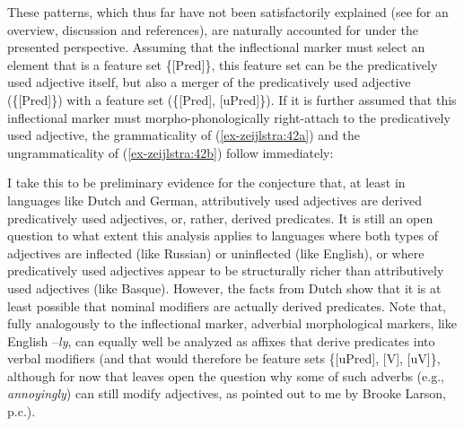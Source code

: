 \documentclass[output=paper
,modfonts
,nonflat]{langsci/langscibook}
\begin{document}
These patterns, which thus far have not been satisfactorily explained (see \citealt{SheehanTA} for an overview, discussion and references), are naturally accounted for under the presented perspective. Assuming that the inflectional marker must select an element that is a feature set \{[Pred]\}, this feature set can be the predicatively used adjective itself, but also a merger of the predicatively used adjective (\{[Pred]\}) with a feature set (\{[Pred], [uPred]\}). If it is further assumed that this inflectional marker must morpho-phonologically right-attach to the predicatively used adjective, the grammaticality of (\ref{ex-zeijlstra:42a}) and the ungrammaticality of (\ref{ex-zeijlstra:42b}) follow immediately:

\begin{exe}
\ex
	\xlist
	
	\endxlist
\end{exe}
I take this to be preliminary evidence for the conjecture that, at least in languages like Dutch and German, attributively used adjectives are derived predicatively used adjectives, or, rather, derived predicates. It is still an open question to what extent this analysis applies to languages where both types of adjectives are inflected (like Russian) or uninflected (like English), or where predicatively used adjectives appear to be structurally richer than attributively used adjectives (like Basque). However, the facts from Dutch show that it is at least possible that nominal modifiers are actually derived predicates. Note that, fully analogously to the inflectional marker, adverbial morphological markers, like English –\textit{ly}, can equally well be analyzed as affixes that derive predicates into verbal modifiers (and that would therefore be feature sets \{[uPred], [V], [uV]\}, although for now that leaves open the question why some of such adverbs (e.g., \textit{annoyingly}) can still modify adjectives, as pointed out to me by Brooke Larson, p.c.).
\end{document}
